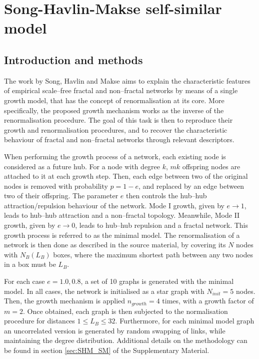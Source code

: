 \chapter{Song-Havlin-Makse self-similar model}


\section{Introduction and methods}
 
The work by Song, Havlin and Makse \cite{song2006origins} aims to explain the characteristic features of empirical scale--free fractal and non--fractal networks by means of a single growth model, that has the concept of renormalisation at its core. More specifically, the proposed growth mechanism works as the inverse of the renormalisation procedure. The goal of this task is then to reproduce their growth and renormalisation procedures, and to recover the characteristic behaviour of fractal and non--fractal networks through relevant descriptors. 

When performing the growth process of a network, each existing node is considered as a future hub. For a node with degree $k$, $mk$ offspring nodes are attached to it at each growth step. Then, each edge between two of the original nodes is removed with probability $p=1-e$, and replaced by an edge between two of their offspring. The parameter $e$ then controls the hub--hub attraction/repulsion behaviour of the network. Mode I growth, given by $e\rightarrow1$, leads to hub--hub attraction and a non--fractal topology. Meanwhile, Mode II growth, given by $e\rightarrow0$, leads to hub--hub repulsion and a fractal network. This growth process is referred to as the minimal model. The renormalisation of a network is then done as described in the source material, by covering its $N$ nodes with $N_B(L_B)$ boxes, where the maximum shortest path between any two nodes in a box must be $L_B$.

For each case $e=1.0, 0.8$, a set of 10 graphs is generated with the minimal model. In all cases, the network is initialised as a star graph with $N_{init}=5$ nodes. Then, the growth mechanism is applied $n_{growth}=4$ times, with a growth factor of $m=2$. Once obtained, each graph is then subjected to the normalisation procedure for distances $1\leq L_B\leq32$. Furthermore, for each minimal model graph an uncorrelated version is generated by random swapping of links, while maintaining the degree distribution. Additional details on the methodology can be found in section \ref{sec:SHM_SM} of the Supplementary Material.


